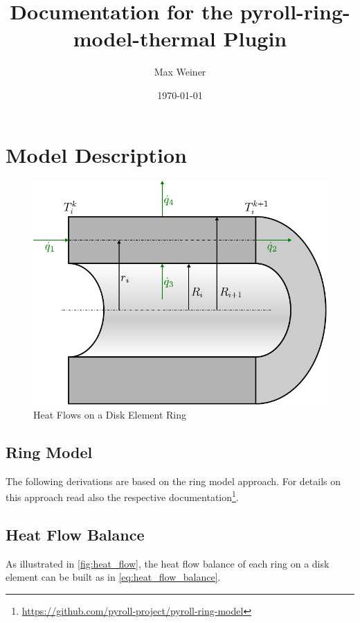 \documentclass{PyRollDocs}
\begin{document}
    \title{Documentation for the pyroll-ring-model-thermal Plugin}
    \author{Max Weiner}
    \date{\today}

    \maketitle


    \section{Model Description}\label{sec:model-description}

    \begin{figure}
        \centering
        \includegraphics[scale=0.8]{img/heat_flow}
        \caption{Heat Flows on a Disk Element Ring}
        \label{fig:heat_flow}
    \end{figure}

    \subsection{Ring Model}

    The following derivations are based on the ring model approach.
    For details on this approach read also the respective documentation\footnote{\url{https://github.com/pyroll-project/pyroll-ring-model}}.

    \subsection{Heat Flow Balance}

    As illustrated in \autoref{fig:heat_flow}, the heat flow balance of each ring on a disk element can be built as in \autoref{eq:heat_flow_balance}.
\end{document}
